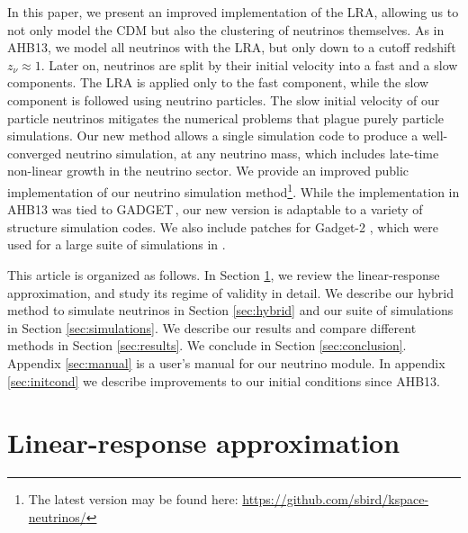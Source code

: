 \documentclass[useAMS, usenatbib]{mnras}
\newcommand{\gadget}{{\small GADGET\,}}
\begin{document}
In this paper, we present an improved implementation of the LRA, allowing us to not only model the CDM but also the clustering of neutrinos themselves.  %
As in AHB13, we model all neutrinos with the LRA, but only down to a cutoff redshift $z_\nu \approx 1$. Later on, neutrinos are split by their initial velocity into a fast and a slow components. The LRA is applied only to the fast component, while the slow component is followed using neutrino particles. The slow initial velocity of our particle neutrinos mitigates the numerical problems that plague purely particle simulations. Our new method allows a single simulation code to produce a well-converged neutrino simulation, at any neutrino mass, which includes late-time non-linear growth in the neutrino sector. %
We provide an improved public implementation of our neutrino simulation
method\footnote{The latest version may be found here: \url{https://github.com/sbird/kspace-neutrinos/}}.
While the implementation in AHB13 was tied to \gadget \citep{Springel_2005}, our new version is adaptable to a variety of structure simulation codes. We also include patches for Gadget-2 \citep{Springel_2005}, which were used for a large suite of simulations in \cite{Liu_2017}.

This article is organized as follows. In Section \ref{sec:lin_resp}, we review the linear-response approximation, and study its regime of validity in detail. We describe our hybrid method to simulate neutrinos in Section \ref{sec:hybrid} and our suite of simulations in Section \ref{sec:simulations}. We describe our results and compare different methods in Section \ref{sec:results}. We conclude in Section \ref{sec:conclusion}. Appendix \ref{sec:manual} is a user's manual for our neutrino module. In appendix \ref{sec:initcond} we describe improvements to our initial conditions since AHB13.


\section{Linear-response approximation} \label{sec:lin_resp}
\end{document}
